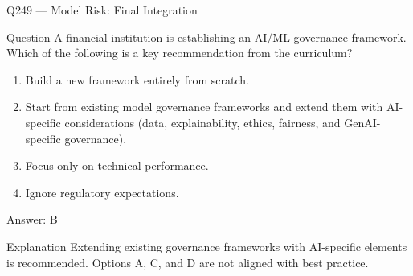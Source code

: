\documentclass[aspectratio=169,8pt]{beamer}
\begin{document}
																																			\begin{frame}{Q249 --- Model Risk: Final Integration}
																																				\begin{block}{Question}
																																					A financial institution is establishing an AI/ML governance framework. Which of the following is a key recommendation from the curriculum?
																																					\begin{enumerate}
																																						\item Build a new framework entirely from scratch.
																																						\item Start from existing model governance frameworks and extend them with AI-specific considerations (data, explainability, ethics, fairness, and GenAI-specific governance).
																																						\item Focus only on technical performance.
																																						\item Ignore regulatory expectations.
																																					\end{enumerate}  \end{block}
																																					\begin{exampleblock}{Answer: B}\end{exampleblock}
																																					\begin{block}{Explanation}
																																						Extending existing governance frameworks with AI-specific elements is recommended. Options A, C, and D are not aligned with best practice.
																																					\end{block}
																																				\end{frame}
																																				
																																																			
\end{document}

